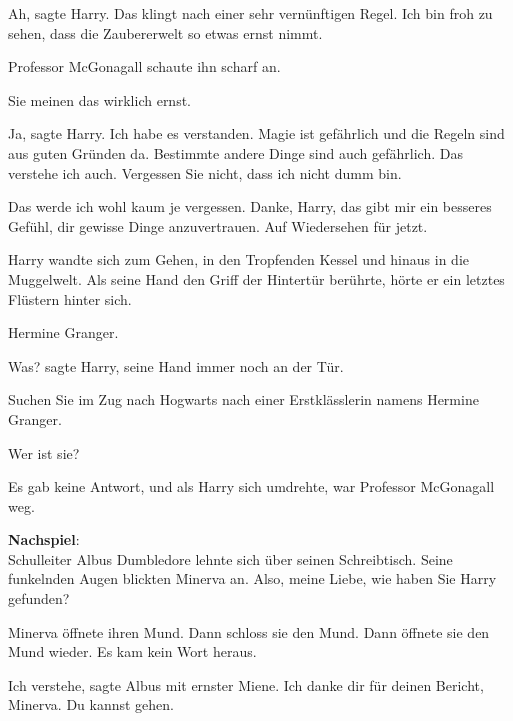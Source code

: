 \glqq{}Ah\grqq{}, sagte Harry. \glqq{}Das klingt nach einer sehr vernünftigen
Regel. Ich bin froh zu sehen, dass die Zaubererwelt so etwas ernst nimmt.\grqq{}

Professor McGonagall schaute ihn scharf an.

\glqq{}Sie meinen das wirklich ernst.\grqq{}

\glqq{}Ja\grqq{}, sagte Harry. \glqq{}Ich habe es verstanden. Magie ist gefährlich
und die Regeln sind aus guten Gründen da. Bestimmte andere Dinge sind auch
gefährlich. Das verstehe ich auch. Vergessen Sie nicht, dass ich nicht dumm
bin.\grqq{}

\glqq{}Das werde ich wohl kaum je vergessen. Danke, Harry, das gibt mir ein
besseres Gefühl, dir gewisse Dinge anzuvertrauen. Auf Wiedersehen für
jetzt.\grqq{}

Harry wandte sich zum Gehen, in den Tropfenden Kessel und hinaus in die
Muggelwelt. Als seine Hand den Griff der Hintertür berührte, hörte er ein
letztes Flüstern hinter sich.

\glqq{}Hermine Granger.\grqq{}

\glqq{}Was?\grqq{} sagte Harry, seine Hand immer noch an der Tür.

\glqq{}Suchen Sie im Zug nach Hogwarts nach einer Erstklässlerin namens Hermine
Granger.\grqq{}

\glqq{}Wer ist sie?\grqq{}

Es gab keine Antwort, und als Harry sich umdrehte, war Professor McGonagall weg.

\textbf{Nachspiel}:\\
Schulleiter Albus Dumbledore lehnte sich über seinen
Schreibtisch. Seine funkelnden Augen blickten Minerva an. \glqq{}Also, meine
Liebe, wie haben Sie Harry gefunden?\grqq{}

Minerva öffnete ihren Mund. Dann schloss sie den Mund. Dann öffnete sie den Mund
wieder. Es kam kein Wort heraus.

\glqq{}Ich verstehe\grqq{}, sagte Albus mit ernster Miene. \glqq{}Ich danke dir
für deinen Bericht, Minerva. Du kannst gehen.\grqq{}
